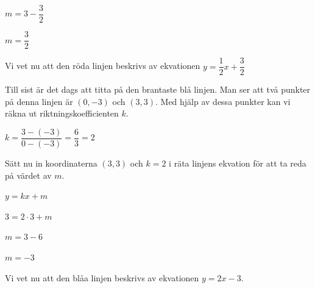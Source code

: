 \documentclass{article}
\begin{document}
$m = 3 - \dfrac{3}{2}$

$m = \dfrac{3}{2}$

Vi vet nu att den röda linjen beskrivs av ekvationen $y = \dfrac{1}{2}x + \dfrac{3}{2}$

Till sist är det dags att titta på den brantaste blå linjen. Man ser att två punkter på denna linjen är $(0, -3)$ och $(3, 3)$. Med hjälp av dessa punkter kan vi räkna ut riktningskoefficienten $k$.

$k=\dfrac{3-(-3)}{0-(-3)}=\dfrac{6}{3}=2$

Sätt nu in koordinaterna $(3, 3)$ och $k = 2$ i räta linjens ekvation för att ta reda på värdet av $m$.

$y = kx + m$

$3 = 2\cdot3 + m$

$m = 3 - 6$

$m = -3$

Vi vet nu att den blåa linjen beskrivs av ekvationen $y = 2x - 3$.
\end{document}
